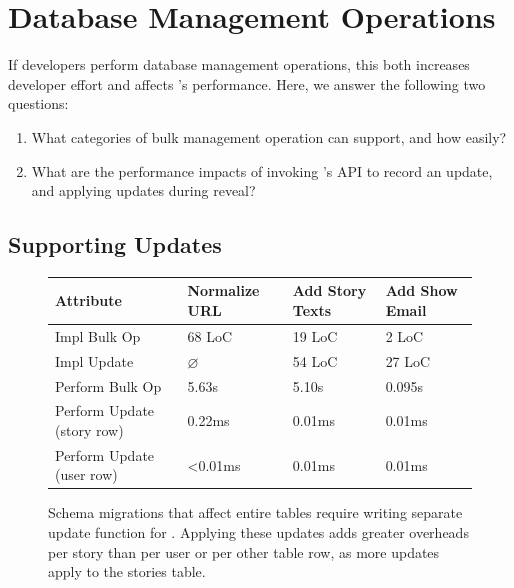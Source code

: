 




\section{Database Management Operations}
\label{s:eval-updates}

%
If developers perform database management operations, this both increases
developer effort and affects \sys's performance. Here, we answer the following two questions:
\begin{enumerate}[nosep]
    \item What categories of bulk management operation can \sys support, and how
        easily? 
    \item What are the performance impacts of invoking \sys's API to record an
        update, and applying updates during reveal?
\end{enumerate}

\subsection{Supporting Updates}
\begin{figure}
    \centering
    \small
    \begin{tabular}{m{}|m{}|m{}|m{}}
        \centering\textbf{Attribute} & \textbf{Normalize URL} & \textbf{Add Story Texts} &
        \textbf{Add Show Email} \\
        \hline
        Impl Bulk Op & 68 LoC & 19 LoC & 2 LoC \\
        \hline
        Impl Update & $\varnothing$ & 54 LoC & 27 LoC \\
        \hline
        Perform Bulk Op & 5.63s & 5.10s & 0.095s\\
        \hline
        Perform Update (story row) & 0.22ms & 0.01ms & 0.01ms \\
        \hline
        Perform Update (user row) & <0.01ms & 0.01ms & 0.01ms 
    \end{tabular}
    \caption{Schema migrations that affect entire tables require
    writing separate update function for \sys. Applying these updates adds greater overheads per
    story than per user or per other table row, as more updates apply to the
    stories table.}
    \label{tab:updates}
\end{figure}

